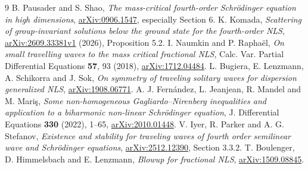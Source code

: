 \documentclass[11pt,a4paper]{article}
\theoremstyle{remark}\newtheorem{remark}[theorem]{Remark}
\begin{document}
\begin{thebibliography}{9}
 B. Pausader and S. Shao, \emph{The mass-critical fourth-order Schr\"odinger equation in high dimensions}, \href{https://arxiv.org/abs/0906.1547}{arXiv:0906.1547}, especially Section 6.
 K. Komada, \emph{Scattering of group-invariant solutions below the ground state for the fourth-order NLS}, \href{https://arxiv.org/abs/2609.33381}{arXiv:2609.33381v1} (2026), Proposition 5.2.
 I. Naumkin and P. Rapha\"el, \emph{On small travelling waves to the mass critical fractional NLS}, Calc. Var. Partial Differential Equations \textbf{57}, 93 (2018), \href{https://arxiv.org/abs/1712.04484}{arXiv:1712.04484}.
 L. Bugiera, E. Lenzmann, A. Schikorra and J. Sok, \emph{On symmetry of traveling solitary waves for dispersion generalized NLS}, \href{https://arxiv.org/abs/1908.06771}{arXiv:1908.06771}.
 A. J. Fern\'andez, L. Jeanjean, R. Mandel and M. Mari\c{s}, \emph{Some non-homogeneous Gagliardo--Nirenberg inequalities and application to a biharmonic non-linear Schr\"odinger equation}, J. Differential Equations \textbf{330} (2022), 1--65, \href{https://arxiv.org/abs/2010.01448}{arXiv:2010.01448}.
 V. Iyer, R. Parker and A. G. Stefanov, \emph{Existence and stability for traveling waves of fourth order semilinear wave and Schr\"odinger equations}, \href{https://arxiv.org/abs/2512.12390}{arXiv:2512.12390}, Section 3.3.2.
 T. Boulenger, D. Himmelsbach and E. Lenzmann, \emph{Blowup for fractional NLS}, \href{https://arxiv.org/abs/1509.08845}{arXiv:1509.08845}.
\end{thebibliography}
\end{document}

